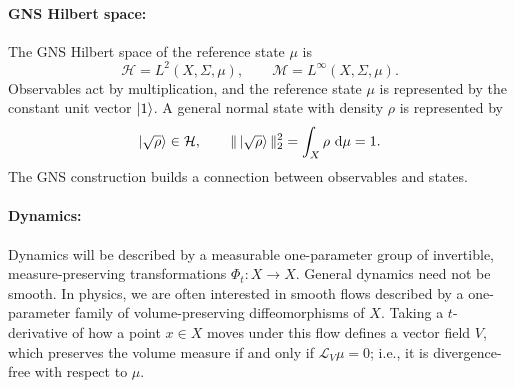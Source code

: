 \documentclass[a4paper,11pt]{article}
\theoremstyle{definition}
\newcommand{\E}{\mathbb{E}}
\newcommand{\dd}{\,\mathrm{d}}
\newcommand{\cH}{\mathcal{H}}
\newcommand{\mH}{\mathcal{H}}
\newcommand{\mM}{\mathcal{M}}
\newcommand{\mE}{\mathcal{E}}
\begin{document}
\paragraph{GNS Hilbert space:} The GNS Hilbert space of the reference state $\mu$ is
\[
  \cH=L^2(X,\Sigma,\mu),
  \qquad
  \mM=L^\infty(X,\Sigma,\mu).
\]
Observables act by multiplication, and the reference state $\mu$ is represented by the constant unit vector $\ket{1}$. A general normal state with density $\rho$ is represented by
\[
  \ket{\sqrt{\rho}}\in\cH,
  \qquad
  \|\ket{\sqrt{\rho}}\|_2^2=\int_X\rho\,\dd\mu=1.
\]
The GNS construction builds a connection between observables and states.


\paragraph{Dynamics:} Dynamics will be described by a measurable one-parameter group of invertible, measure-preserving transformations $\Phi_t:X\to X$. General dynamics need not be smooth. In physics, we are often interested in smooth flows described by a one-parameter family of volume-preserving diffeomorphisms of $X$. Taking a $t$-derivative of how a point $x\in X$ moves under this flow defines a vector field $V$, which preserves the volume measure if and only if $\mathcal{L}_V\mu=0$; i.e., it is divergence-free with respect to $\mu$.




\end{document}
